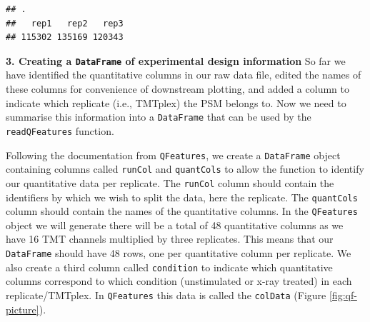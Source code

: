 \documentclass[9pt,a4paper,]{extarticle}
\newenvironment{Shaded}{\begin{snugshade}}{\end{snugshade}}
\newcommand{\DocumentationTok}[1]{\textcolor[rgb]{0.56,0.35,0.01}{\textbf{\textit{#1}}}}
\newcommand{\FunctionTok}[1]{\textcolor[rgb]{0.13,0.29,0.53}{\textbf{#1}}}
\newcommand{\NormalTok}[1]{#1}
\newcommand{\OtherTok}[1]{\textcolor[rgb]{0.56,0.35,0.01}{#1}}
\newcommand{\SpecialCharTok}[1]{\textcolor[rgb]{0.81,0.36,0.00}{\textbf{#1}}}
\newcommand{\StringTok}[1]{\textcolor[rgb]{0.31,0.60,0.02}{#1}}
\begin{document}
\begin{Shaded}
\end{Shaded}

\begin{verbatim}
## .
##   rep1   rep2   rep3 
## 115302 135169 120343
\end{verbatim}

\textbf{3. Creating a \texttt{DataFrame} of experimental design information}
So far we have identified the quantitative columns in our raw data file, edited
the names of these columns for convenience of downstream plotting, and added
a column to indicate which replicate (i.e., TMTplex) the PSM belongs to. Now we
need to summarise this information into a \texttt{DataFrame} that can be used by the
\texttt{readQFeatures} function.

Following the documentation from \texttt{QFeatures}, we create a \texttt{DataFrame} object
containing columns called \texttt{runCol} and \texttt{quantCols} to allow the function
to identify our quantitative data per replicate. The \texttt{runCol} column should
contain the identifiers by which we wish to split the data, here the replicate.
The \texttt{quantCols} column should contain the names of the quantitative columns. In
the \texttt{QFeatures} object we will generate there will be a total of 48 quantitative
columns as we have 16 TMT channels multiplied by three replicates. This means that
our \texttt{DataFrame} should have 48 rows, one per quantitative column per replicate.
We also create a third column called \texttt{condition} to indicate which quantitative
columns correspond to which condition (unstimulated or x-ray treated) in each replicate/TMTplex.
In \texttt{QFeatures} this data is called the \texttt{colData} (Figure \ref{fig:qf-picture}).
\end{document}
